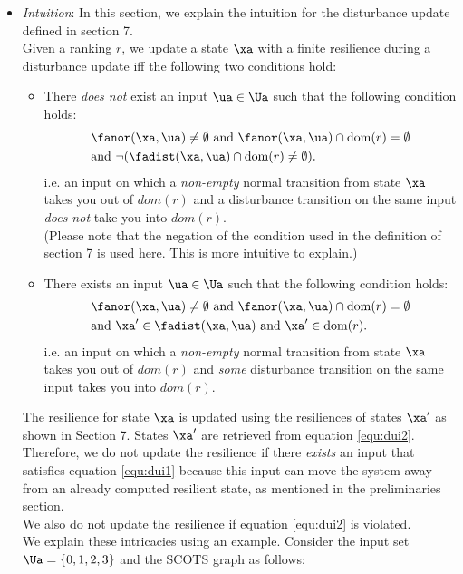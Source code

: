 \begin{itemize}
\item \emph{Intuition}:
In this section, we explain the intuition for the disturbance update defined in section 7. \\
Given a ranking $r$, we update a state $\xa$ with a finite resilience during a disturbance update iff the following two conditions hold: 
\begin{itemize}
\item  There \emph{does not} exist an input $\ua \in \Ua$ such that the following condition holds:
\begin{align}
\begin{split}
	& \fanor(\xa, \ua) \neq \emptyset \text{ and } \fanor(\xa, \ua) \cap \mathrm{dom}(r) = \emptyset \\
	& \text{and } \neg (\fadist(\xa, \ua) \cap \mathrm{dom}(r) \neq \emptyset). \label{equ:dui1}
\end{split}
\end{align}
i.e. an input on which a \emph{non-empty} normal transition from state $\xa$ takes you out of ${dom}(r)$ and a disturbance transition on the same input \emph{does not} take you into ${dom}(r)$. \\
(Please note that the negation of the condition used in the definition of section 7 is used here. This is more intuitive to explain.)
\item  There exists an input $\ua \in \Ua$ such that the following condition holds:
\begin{align}
\begin{split}
	& \fanor(\xa, \ua) \neq \emptyset \text{ and } \fanor(\xa, \ua) \cap \mathrm{dom}(r) = \emptyset \\
	& \text{and } \xa' \in \fadist(\xa, \ua) \text{ and } \xa' \in \mathrm{dom}(r). \label{equ:dui2}
\end{split}
\end{align}
i.e. an input on which a \emph{non-empty} normal transition from state $\xa$ takes you out of ${dom}(r)$ and \emph{some} disturbance transition on the same input takes you into ${dom}(r)$.
\end{itemize}
The resilience for state $\xa$ is updated using the resiliences of states $\xa'$ as shown in Section 7. States $\xa'$ are retrieved from equation \ref{equ:dui2}.
\\

Therefore, we do not update the resilience if there \emph{exists} an input that satisfies equation \ref{equ:dui1} because this input can move the system away from an already computed resilient state, as mentioned in the preliminaries section.
\\
We also do not update the resilience if equation \ref{equ:dui2} is violated.\\
We explain these intricacies using an example.
Consider the input set $\Ua =\{0,1,2,3\}$ and the SCOTS graph as follows:


\end{itemize}
